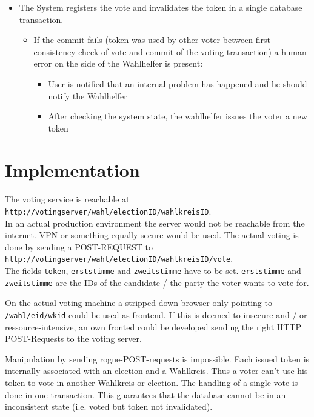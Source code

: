 \documentclass[10pt,a4paper]{article}
\begin{document}
\begin{itemize}
	\item The System registers the vote and invalidates the token in a single database transaction.
		\begin{itemize}
			\item If the commit fails 
			(token was used by other voter between first consistency check of vote and commit 
			of the voting-transaction) a human error on the side of the Wahlhelfer is present:
				\begin{itemize}
					\item User is notified that an internal problem has happened and
					 he should notify the Wahlhelfer
					\item After checking the system state, 
					the wahlhelfer issues the voter a new token
			\end{itemize}
	\end{itemize}
\end{itemize}

\section*{Implementation}

\paragraph*{}
The voting service is reachable at \\
\texttt{http://votingserver/wahl/electionID/wahlkreisID}. \\
In an actual production environment the server would not be reachable from the internet. VPN or something equally secure would be used. The actual voting is done by sending a POST-REQUEST to \\ \texttt{http://votingserver/wahl/electionID/wahlkreisID/vote}. \\
The fields \texttt{token}, \texttt{erststimme} and \texttt{zweitstimme} have to be set. \texttt{erststimme} and \texttt{zweitstimme} are the IDs of the candidate / the party the voter wants to vote for. 

On the actual voting machine a stripped-down browser only pointing to \texttt{/wahl/eid/wkid} could be used as frontend. If this is deemed to insecure and / or ressource-intensive, an own fronted could be developed sending the right HTTP POST-Requests to the voting server.

Manipulation by sending rogue-POST-requests is impossible. Each issued token is internally associated with an election and a Wahlkreis. Thus a voter can't use his token to vote in another Wahlkreis or election. The handling of a single vote is done in one transaction. This guarantees that the database cannot be in an inconsistent state (i.e. voted but token not invalidated).
\end{document}

